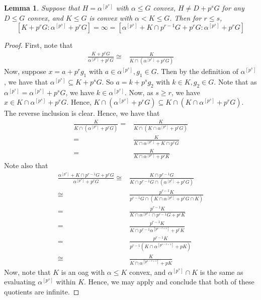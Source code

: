 \documentclass[a4paper,11pt]{article}
\newtheorem{lemma}[theorem]{Lemma}
\begin{document}
\begin{lemma}\label{leftnonconvexconvexrelationship}
	Suppose that $H=\alpha^{[p^s]}$ with $\alpha\leq G$ convex, $H\neq D+p^sG$ for any $D\leq G$ convex, and $K\leq G$ is convex with $\alpha <K\leq G$. Then for $r\leq s$, $$[K+p^rG:\alpha^{[p^s]}+p^rG] =\infty = [\alpha^{[p^s]}+K\cap p^{r-1}G+p^rG:\alpha^{[p^s]}+p^rG] $$
\end{lemma}
\begin{proof}
	First, note that 
	\begin{align*}
		\frac{K+p^rG}{\alpha^{[p^s]}+p^rG} \cong& \frac{K}{K\cap(\alpha^{[p^s]}+p^rG)} %
	\end{align*}
	Now, suppose $x = a+p^rg_1$ with $a\in \alpha^{[p^s]}, g_1\in G$. Then by the definition of $\alpha^{[p^s]}$, we have that $\alpha^{[p^s]}\subseteq K+p^sG$. So $a = k + p^sg_2$ with $k\in K, g_2\in G$. Note that as $\alpha^{[p^s]} = \alpha^{[p^s]}+p^sG$, we have $k\in \alpha^{[p^s]}$. Now, as $s\geq r$, we have $x\in K\cap\alpha^{[p^s]}+p^rG$. Hence, $K\cap (\alpha^{[p^s]}+p^rG)\subseteq K\cap(K\cap\alpha^{[p^s]}+p^rG)$. The reverse inclusion is clear. Hence, we have that 
	\begin{align*}
		\frac{K}{K\cap(\alpha^{[p^s]}+p^rG)} = & \frac{K}{K\cap(K\cap \alpha^{[p^s]}+p^rG)} \\
		= & \frac{K}{K\cap \alpha^{[p^s]}+K\cap p^rG} \\
		= & \frac{K}{K\cap \alpha^{[p^s]}+p^rK}
	\end{align*}
	Note also that
	\begin{align*}
		\frac{\alpha^{[p^s]}+K\cap p^{r-1}G +p^rG}{\alpha^{[p^s]}+p^rG} \cong& \frac{K\cap p^{r-1}G}{K\cap p^{r-1}G\cap(\alpha^{[p^s]}+p^rG)} \\
		\cong& \frac{p^{r-1}K}{p^{r-1}G\cap(K\cap\alpha^{[p^s]}+p^rG\cap K)} \\
		= & \frac{p^{r-1}K}{K\cap\alpha^{[p^s]}\cap p^{r-1}G+p^rK} \\
		= & \frac{p^{r-1}K}{K\cap p^{r-1}\alpha^{[p^{s-r+1}]}+p^rK} \\
		= & \frac{p^{r-1}K}{p^{r-1}(K\cap \alpha^{[p^{s-r+1}]}+pK)} \\
		\cong & \frac{K}{K\cap \alpha^{[p^{s-r+1}]}+pK}
	\end{align*}
	Now, note that $K$ is an oag with $\alpha\leq K$ convex, and $\alpha^{[p^s]}\cap K$ is the same as evaluating $\alpha^{[p^s]}$ within $K$. Hence, we may apply  and conclude that both of these quotients are infinite.
\end{proof}
\end{document}
